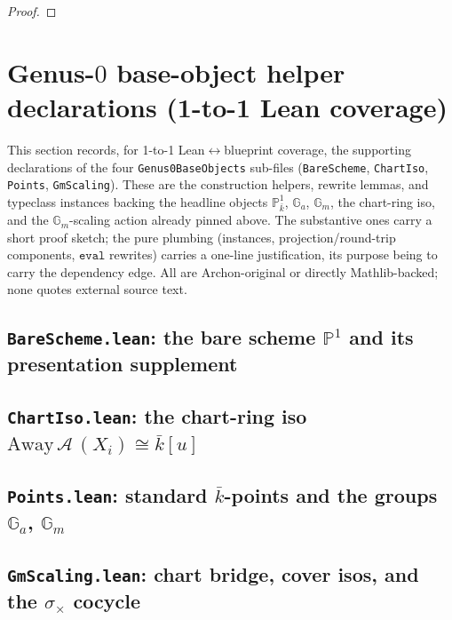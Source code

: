 \begin{proof}
  
\end{proof}
\section{Genus-\(0\) base-object helper declarations (1-to-1 Lean coverage)}
\label{sec:genus0_helpers}
This section records, for 1-to-1 Lean\(\leftrightarrow\)blueprint coverage, the supporting
declarations of the four \texttt{Genus0BaseObjects} sub-files (\texttt{BareScheme},
\texttt{ChartIso}, \texttt{Points}, \texttt{GmScaling}). These are the construction
helpers, rewrite lemmas, and typeclass instances backing the headline objects \(\mathbb
P^1_{\bar k}\), \(\mathbb G_a\), \(\mathbb G_m\), the chart-ring iso, and the \(\mathbb
G_m\)-scaling action already pinned above. The substantive ones carry a short proof
sketch; the pure plumbing (instances, projection/round-trip components, \(\mathtt{eval}\)
rewrites) carries a one-line justification, its purpose being to carry the dependency edge.
All are Archon-original or directly Mathlib-backed; none quotes external source text.

\subsection*{\texttt{BareScheme.lean}: the bare scheme \(\mathbb P^1\) and its presentation supplement}


\subsection*{\texttt{ChartIso.lean}: the chart-ring iso \(\mathrm{Away}\,\mathcal A\,(X_i) \cong \bar k[u]\)}


\subsection*{\texttt{Points.lean}: standard \(\bar k\)-points and the groups \(\mathbb G_a\), \(\mathbb G_m\)}


\subsection*{\texttt{GmScaling.lean}: chart bridge, cover isos, and the \(\sigma_\times\) cocycle}

